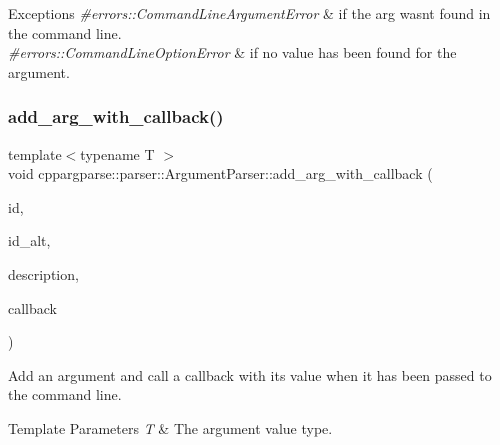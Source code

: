 \begin{DoxyExceptions}{Exceptions}
{\em \#errors\+::\+Command\+Line\+Argument\+Error} & if the arg wasn\textquotesingle{}t found in the command line. \\
\hline
{\em \#errors\+::\+Command\+Line\+Option\+Error} & if no value has been found for the argument. \\
\hline
\end{DoxyExceptions}
\mbox{\label{classcppargparse_1_1parser_1_1ArgumentParser_aace5e7d0b1dd1831bc06ae7d3c3f2725}} 
\subsubsection{\texorpdfstring{add\+\_\+arg\+\_\+with\+\_\+callback()}{add\_arg\_with\_callback()}\hspace{0.1cm}{\footnotesize\ttfamily [3/3]}}
{\footnotesize\ttfamily template$<$typename T $>$ \\
void cppargparse\+::parser\+::\+Argument\+Parser\+::add\+\_\+arg\+\_\+with\+\_\+callback (\begin{DoxyParamCaption}\item[{const std\+::string \&}]{id,  }\item[{const std\+::string \&}]{id\+\_\+alt,  }\item[{const std\+::string \&}]{description,  }\item[{const std\+::function$<$ void(const \hyperlink{classcppargparse_1_1parser_1_1ArgumentParser}{Argument\+Parser} \&, const T \&)$>$ \&}]{callback }\end{DoxyParamCaption})\hspace{0.3cm}{\ttfamily [inline]}}



Add an argument and call a callback with its value when it has been passed to the command line. 


\begin{DoxyTemplParams}{Template Parameters}
{\em T} & The argument value type.\\
\hline
\end{DoxyTemplParams}

